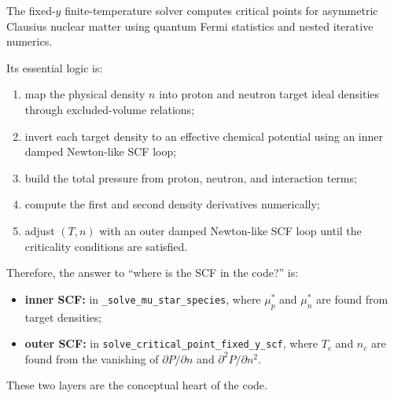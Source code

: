 \documentclass[11pt]{article}
\begin{document}
The fixed-$y$ finite-temperature solver computes critical points for asymmetric
Clausius nuclear matter using quantum Fermi statistics and nested iterative
numerics.

Its essential logic is:
\begin{enumerate}
\item map the physical density $n$ into proton and neutron target ideal
densities through excluded-volume relations;
\item invert each target density to an effective chemical potential using an
inner damped Newton-like SCF loop;
\item build the total pressure from proton, neutron, and interaction terms;
\item compute the first and second density derivatives numerically;
\item adjust $(T,n)$ with an outer damped Newton-like SCF loop until the
criticality conditions are satisfied.
\end{enumerate}

Therefore, the answer to ``where is the SCF in the code?'' is:
\begin{itemize}
\item \textbf{inner SCF:} in
\texttt{\_solve\_mu\_star\_species}, where $\mu_p^\ast$ and $\mu_n^\ast$ are
found from target densities;
\item \textbf{outer SCF:} in
\texttt{solve\_critical\_point\_fixed\_y\_scf}, where $T_c$ and $n_c$ are found
from the vanishing of $\partial P/\partial n$ and $\partial^2 P/\partial n^2$.
\end{itemize}

These two layers are the conceptual heart of the code.
\end{document}
